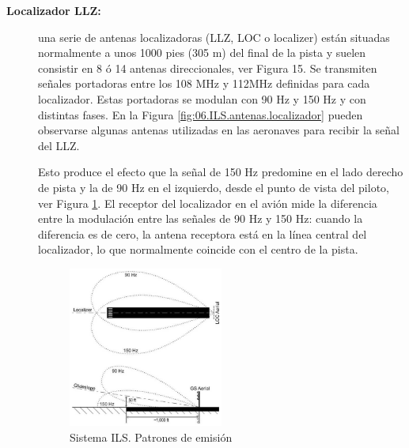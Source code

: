 \begin{description}
\item [\bf Localizador LLZ:] una serie de antenas localizadoras (LLZ, LOC o
  localizer) están situadas normalmente a unos 1000 pies (305 m) del
  final de la pista y suelen consistir en 8 ó 14 antenas
  direccionales, ver Figura 15. Se transmiten señales portadoras entre
  los 108 MHz y 112MHz definidas para cada localizador. Estas
  portadoras se modulan con 90 Hz y 150 Hz y con distintas fases.
  En la Figura \ref{fig:06.ILS.antenas.localizador}
  pueden observarse algunas antenas utilizadas en las aeronaves para recibir
  la señal del LLZ.
  
Esto produce el efecto que la señal de 150 Hz predomine en el lado derecho de pista y la de 90
Hz en el izquierdo, desde el punto de vista del piloto, ver Figura \ref{fig:06.ILS.sistema.patrones.emision}.
El receptor del localizador
en el avión mide la diferencia entre la modulación entre las señales de 90 Hz y 150 Hz: cuando
la diferencia es de cero, la antena receptora está en la línea central del localizador, lo que
normalmente coincide con el centro de la pista.

\begin{figure}[!htb]
  \centering
  \includegraphics[width = 0.5\textwidth]{06.radionavegacion/Imagenes/06.Sistemas.Aproximacion/06_ILS_patronesEmision.png}
    \caption{ Sistema ILS. Patrones de emisión}
  \label{fig:06.ILS.sistema.patrones.emision}
\end{figure}


\begin{figure}[!htb]
  \centering


\end{figure}
\end{description}
